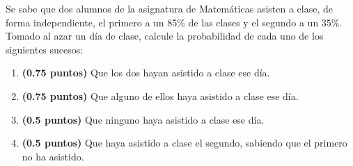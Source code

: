 
Se sabe que dos alumnos de la asignatura de Matemáticas asisten a clase, de forma independiente, el primero a un 85\% de las clases y el segundo a un 35\%. Tomado al azar un día de clase, calcule la probabilidad de cada uno de los siguientes sucesos:
\begin{enumerate}[label=\alph*)]
\item \textbf{(0.75 puntos)} Que los dos hayan asistido a clase ese día.
\item \textbf{(0.75 puntos)} Que alguno de ellos haya asistido a clase ese día.
\item \textbf{(0.5 puntos)} Que ninguno haya asistido a clase ese día.
\item \textbf{(0.5 puntos)} Que haya asistido a clase el segundo, sabiendo que el primero no ha asistido.
\end{enumerate}
